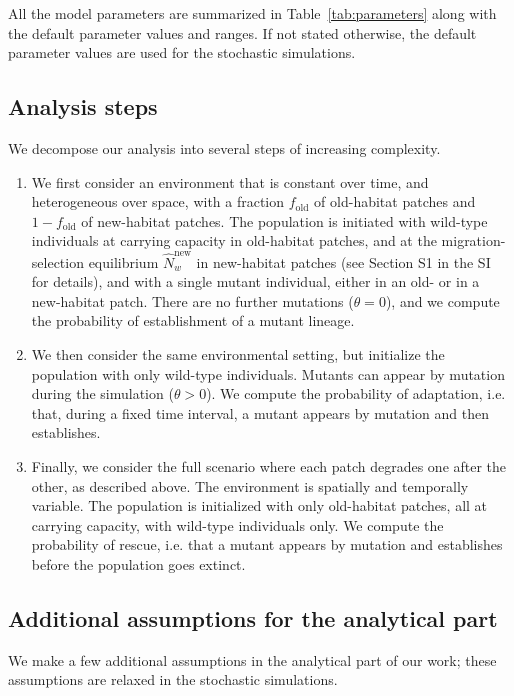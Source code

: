 \documentclass[a4paper,11pt]{article}
\begin{document}
 All the model parameters are summarized in Table~\ref{tab:parameters} along with the default parameter values and ranges. If not stated otherwise, the default parameter values are used for the stochastic simulations. 

\subsection*{Analysis steps}
We decompose our analysis into several steps of increasing complexity. 
\begin{enumerate}
	\item We first consider an environment that is constant over time, and heterogeneous over space, with a fraction $f_{\text{old}}$ of old-habitat patches and $1-f_{\text{old}}$ of new-habitat patches. The population is initiated with wild-type individuals at carrying capacity in old-habitat patches, and at the migration-selection equilibrium $\widehat{N}_w^{\text{new}}$ in new-habitat patches (see Section S1 in the SI for details), 
	and with a single mutant individual, either in an old- or in a new-habitat patch. There are no further mutations ($\theta = 0$), and we compute the probability of establishment of a mutant lineage. 
	\item We then consider the same environmental setting, but initialize the population with only wild-type individuals. Mutants can appear by mutation during the simulation ($\theta >0$). We compute the probability of adaptation, i.e. that, during a fixed time interval, a mutant appears by mutation and then establishes. 
	\item Finally, we consider the full scenario where each patch degrades one after the other, as described above. The environment is spatially and temporally variable. The population is initialized with only old-habitat patches, all at carrying capacity, with wild-type individuals only. We compute the probability of rescue, i.e. that a mutant appears by mutation and establishes before the population goes extinct. 
\end{enumerate}



\subsection*{Additional assumptions for the analytical part}
We make a few additional assumptions in the analytical part of our work; these assumptions are relaxed in the stochastic simulations. 
\end{document}
